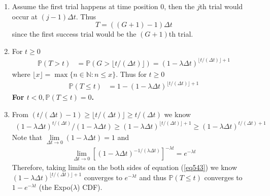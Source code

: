 

\setcounter{theorem}{42}
\begin{exercise}[BH.5.43]
\begin{solution}
    \begin{enumerate}
	    \item Assume the first trial happens at time position $0$, then the $j$th trial would occur at $(j-1)\Delta t$. Thus
    	\[T=((G+1) - 1)\Delta t\] 
    	since the first success trial would be the $(G+1)$th trial.  
    	\item For $t\geq 0$
    	\begin{align*}
    		\mathbb{P}\left(T>t\right) &= \mathbb{P}\left(G> \lfloor t /(\Delta t)\rfloor \right) = \left( 1-\lambda \Delta t \right)^{\lfloor t /(\Delta t)\rfloor +1 }
    	\end{align*}
    	where $\lfloor x \rfloor = \max\{n \in \mathbb{N}: n\leq x \}$. Thus for $t\geq 0$
    	\begin{align*}
    		\mathbb{P}\left(T\leq t\right) &= 1- \left( 1-\lambda \Delta t \right)^{\lfloor t /(\Delta t)\rfloor +1 }
    	\end{align*}
    	\textbf{For $t<0, \mathbb{P}\left(T\leq t\right)=0$.
    	}
        \item From 
    	$\left(t /(\Delta t) -1 \right)\geq \lfloor t /(\Delta t)\rfloor \geq t /(\Delta t)$
    	we know 
    	\begin{align}
    		\left( 1-\lambda \Delta t \right)^{  t /(\Delta t) }/\left( 1-\lambda \Delta t \right) \geq \left( 1-\lambda \Delta t \right)^{\lfloor t /(\Delta t)\rfloor +1 } \geq \left( 1-\lambda \Delta t \right)^{ t /(\Delta t) +1} \label{eq543}
    	\end{align}
    	Note that $\lim\limits_{\Delta t\rightarrow 0}\left( 1-\lambda \Delta t \right)=1$ and 
    	\begin{align*}
    		\lim\limits_{\Delta t\rightarrow 0}\left[\left( 1-\lambda \Delta t \right)^{ -1 /(\lambda \Delta t) }\right]^{-\lambda t} = e^{-\lambda t}
    	\end{align*}
    	Therefore, taking limits on the both sides of equation (\ref{eq543}) we know $ \left( 1-\lambda \Delta t \right)^{\lfloor t /(\Delta t)\rfloor +1 }$ converges to $e^{-\lambda t}$ and thus $\mathbb{P}(T\leq t)$ converges to $1-e^{-\lambda t}$ (the Expo($\lambda$) CDF). 
	\end{enumerate}
\end{solution}
\end{exercise}


